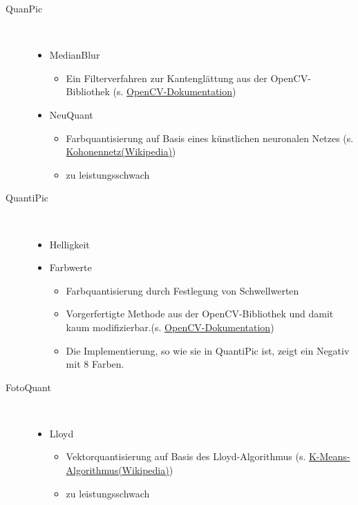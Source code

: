 \begin{description}
\item[QuanPic]~\par
\begin{itemize}
\item MedianBlur 
	\begin{itemize}
	\item Ein Filterverfahren zur Kantenglättung aus der OpenCV-Bibliothek (s. \href{http://docs.opencv.org/2.4/doc/tutorials/imgproc/gausian_median_blur_bilateral_filter/gausian_median_blur_bilateral_filter.html}{OpenCV-Dokumentation})
	\end{itemize}
\item NeuQuant 
	\begin{itemize}
	\item Farbquantisierung auf Basis eines künstlichen neuronalen Netzes (s. \href{https://de.wikipedia.org/wiki/Selbstorganisierende_Karte}{Kohonennetz(Wikipedia)}) 
	\item zu leistungsschwach
	\end{itemize}
\end{itemize}

\item[QuantiPic]~\par
\begin{itemize}
\item Helligkeit
\item Farbwerte
	\begin{itemize}
	\item Farbquantisierung durch Festlegung von Schwellwerten 
	\item Vorgerfertigte Methode aus der OpenCV-Bibliothek und damit kaum modifizierbar.(s. \href{http://docs.opencv.org/2.4/doc/tutorials/imgproc/gausian_median_blur_bilateral_filter/gausian_median_blur_bilateral_filter.html}{OpenCV-Dokumentation})
	\item Die Implementierung, so wie sie in QuantiPic ist, zeigt ein Negativ mit 8 Farben. 
\end{itemize}
\end{itemize}

\item[FotoQuant]~\par
\begin{itemize}
\item Lloyd
	\begin{itemize}
	\item Vektorquantisierung auf Basis des Lloyd-Algorithmus (s. \href{https://de.wikipedia.org/wiki/K-Means-Algorithmus}{K-Means-Algorithmus(Wikipedia)})
	\item zu leistungsschwach
\end{itemize}
\end{itemize}



\end{description}
